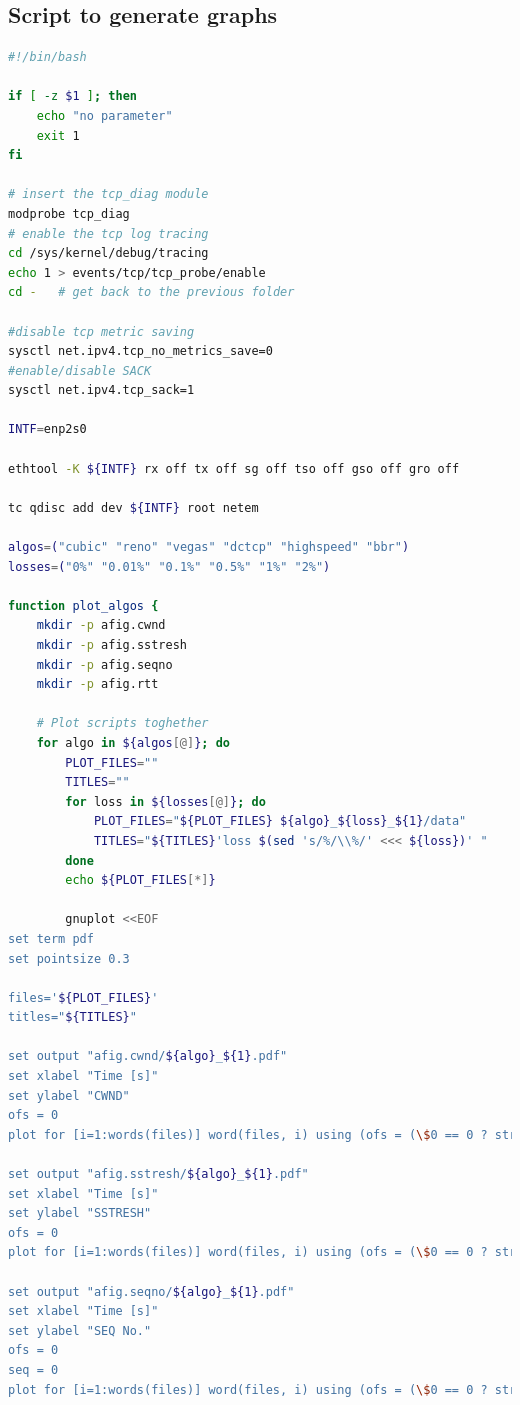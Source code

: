 \documentclass{exam}
\begin{document}
\subsection{Script to generate graphs}
\begin{lstlisting}[language=bash]
#!/bin/bash

if [ -z $1 ]; then
	echo "no parameter"
	exit 1
fi

# insert the tcp_diag module
modprobe tcp_diag
# enable the tcp log tracing
cd /sys/kernel/debug/tracing
echo 1 > events/tcp/tcp_probe/enable
cd -   # get back to the previous folder

#disable tcp metric saving
sysctl net.ipv4.tcp_no_metrics_save=0
#enable/disable SACK
sysctl net.ipv4.tcp_sack=1

INTF=enp2s0

ethtool -K ${INTF} rx off tx off sg off tso off gso off gro off

tc qdisc add dev ${INTF} root netem

algos=("cubic" "reno" "vegas" "dctcp" "highspeed" "bbr")
losses=("0%" "0.01%" "0.1%" "0.5%" "1%" "2%")

function plot_algos {
	mkdir -p afig.cwnd
	mkdir -p afig.sstresh
	mkdir -p afig.seqno
	mkdir -p afig.rtt

	# Plot scripts toghether
	for algo in ${algos[@]}; do
		PLOT_FILES=""
		TITLES=""
		for loss in ${losses[@]}; do
			PLOT_FILES="${PLOT_FILES} ${algo}_${loss}_${1}/data"
			TITLES="${TITLES}'loss $(sed 's/%/\\%/' <<< ${loss})' "
		done
		echo ${PLOT_FILES[*]}

		gnuplot <<EOF
set term pdf
set pointsize 0.3

files='${PLOT_FILES}'
titles="${TITLES}"

set output "afig.cwnd/${algo}_${1}.pdf"
set xlabel "Time [s]"
set ylabel "CWND"
ofs = 0
plot for [i=1:words(files)] word(files, i) using (ofs = (\$0 == 0 ? strcol(1) : ofs), strcol(1) - ofs):5 title word(titles, i) with linespoint

set output "afig.sstresh/${algo}_${1}.pdf"
set xlabel "Time [s]"
set ylabel "SSTRESH"
ofs = 0
plot for [i=1:words(files)] word(files, i) using (ofs = (\$0 == 0 ? strcol(1) : ofs), strcol(1) - ofs):(\$6 < 2000000 ? \$6 : 0) title word(titles, i) with linespoint

set output "afig.seqno/${algo}_${1}.pdf"
set xlabel "Time [s]"
set ylabel "SEQ No."
ofs = 0
seq = 0
plot for [i=1:words(files)] word(files, i) using (ofs = (\$0 == 0 ? strcol(1) : ofs), strcol(1) - ofs):(seq = (\$0 == 0 ? strcol(3) : seq), strcol(3) - seq >= 0 ? strcol(3) - seq : 1/0) title word(titles, i) with linespoint


\end{lstlisting}
\end{document}
